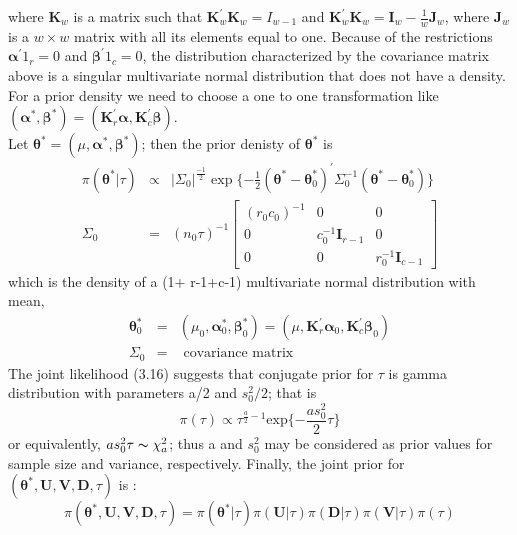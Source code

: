 where $\textbf{K}_w$ is a matrix such that $ \textbf{K}_w^\prime \textbf{K}_w=I_{w-1}$ and $\textbf {K}_w^\prime \textbf{K}_w=\textbf{I}_w-\frac{1}{w}\textbf{J}_w$, where $\textbf{J}_w$ is a $w \times w $ matrix with all its elements equal to one. Because of the restrictions $\bm{\alpha}^\prime1_r=0$ and $\bm{\beta}^\prime 1_c=0$, the distribution characterized by the covariance matrix above is a singular multivariate normal distribution that does not have a density. For a prior density we need to choose a one to one transformation like $(\bm{\alpha}^*,\bm{\beta}^*)=(\textbf{K}_r^\prime\bm{\alpha},\textbf{K}_c^\prime\bm{\beta})$.\\
Let $\bm{\theta}^*=(\mu,\bm{\alpha}^*,\bm{\beta}^*)$; then the prior denisty of $\bm{\theta}^*$ is
\begin{eqnarray}
	\pi(\bm{\theta}^*|\tau) &\varpropto& \left|\Sigma_0\right|^\frac{-1}{2} \exp \{-\frac{1}{2}(\bm{\theta}^*-\bm{\theta}_0^*)^\prime \Sigma_0^{-1}(\bm{\theta}^*-\bm{\theta}_0^*)\} \nonumber \\
\Sigma_0&=&(n_0\tau)^{-1}	\begin{bmatrix}
	(r_0c_0)^{-1} & 0 & 0 \\
	0 & c_0^{-1}\textbf{I}_{r-1} & 0\\
	0 & 0 & r_0^{-1} \textbf{I}_{c-1}
	\end{bmatrix}
	\end{eqnarray} 
which is the density of a (1+ r-1+c-1) multivariate normal distribution with mean, \\
 \begin{eqnarray}
 \bm{\theta}_0^*&=&(\mu_0,\bm{\alpha}_0^*,\bm{\beta}_0^*)=(\mu,\textbf{K}_r^\prime \bm{\alpha}_0, \textbf{K}_c^\prime \bm{\beta}_0)  \nonumber \\
 \Sigma_0 &=& \text{ covariance matrix}  \nonumber
\end{eqnarray}
The joint likelihood (3.16) suggests that conjugate prior for $\tau$ is gamma distribution with parameters a/2 and $s_0^2/2$; that is 
\begin{equation}
	\pi(\tau) \varpropto \tau^{\frac{a}{2}-1} \text{exp} \{-\frac{a s_0^2}{2}\tau\}
\end{equation}
or equivalently, $a s_0^2\tau \thicksim \chi_a^2$; thus a and $s_0^2$ may be considered as prior values for sample size and variance, respectively. Finally, the joint prior for $(\bm{\theta}^*,\textbf{U},\textbf{V},\textbf{D}, \tau)$ is :
\begin{equation}
	\pi(\bm{\theta}^*,\textbf{U},\textbf{V},\textbf{D},\tau)=\pi(\bm{\theta}^*|\tau)\pi(\textbf{U}|\tau)\pi(\textbf{D}|\tau)\pi(\textbf{V}|\tau)\pi(\tau)
\end{equation} 

